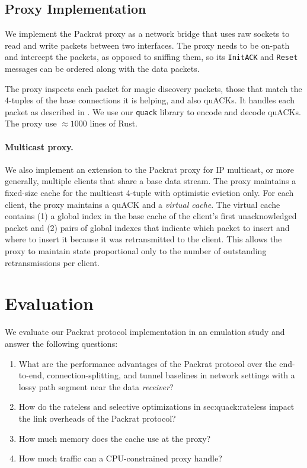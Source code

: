 \subsection{Proxy Implementation}
\label{sec:packrat:implementation:proxy}

We implement the Packrat proxy as a network bridge that uses raw sockets to read
and write packets between two interfaces. The proxy needs to
be on-path and intercept the packets, as opposed to sniffing them, so
its \texttt{InitACK} and \texttt{Reset} messages can be ordered along with the
data packets.

The proxy inspects each packet for magic discovery packets, those that match the
4-tuples of the base connections it is helping, and also quACKs. It handles
each packet as described in . We use
our \texttt{quack} library to encode and decode quACKs. The proxy use
$\approx\!1000$ lines of Rust.

\paragraph{Multicast proxy.}

We also implement an extension to the Packrat proxy for IP multicast, or more
generally, multiple clients that share a base data stream. The proxy maintains
a fixed-size cache for the multicast 4-tuple with optimistic eviction only. For
each client, the proxy maintains a quACK and a \textit{virtual cache}. The
virtual cache contains (1) a global index in the base cache of the client's
first unacknowledged packet and (2) pairs of global indexes that indicate which
packet to insert and where to insert it because it was retransmitted to the
client. This allows the proxy to maintain state proportional only to the number
of outstanding retransmissions per client.

\section{Evaluation}
\label{sec:packrat:evaluation}

We evaluate our Packrat protocol implementation in an emulation study and answer
the following questions:
\begin{enumerate}[noitemsep]
    \item What are the performance advantages of the Packrat protocol over the
     end-to-end, connection-splitting, and tunnel baselines in network settings
     with a lossy path segment near the data \textit{receiver}?
    \item How do the rateless and selective optimizations in \Cref
     {sec:quack:rateless} impact the link overheads of the Packrat protocol?
    \item How much memory does the cache use at the proxy?
    \item How much traffic can a CPU-constrained proxy handle?
\end{enumerate}

